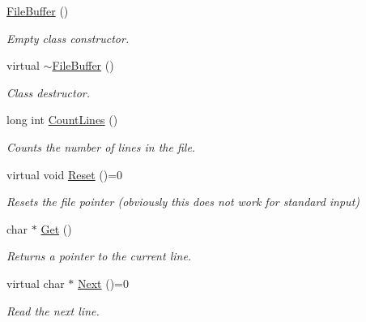 \begin{DoxyCompactItemize}
\item 
\hypertarget{classFileBuffer_ab243cfcb8a68ce791103594e974ee9ba}{
\hyperlink{classFileBuffer_ab243cfcb8a68ce791103594e974ee9ba}{FileBuffer} ()}
\label{classFileBuffer_ab243cfcb8a68ce791103594e974ee9ba}

\begin{DoxyCompactList}\small\item\em Empty class constructor. \end{DoxyCompactList}\item 
\hypertarget{classFileBuffer_ac92d5e7d145ea18fc6a3a6a18c788ebb}{
virtual \hyperlink{classFileBuffer_ac92d5e7d145ea18fc6a3a6a18c788ebb}{$\sim$FileBuffer} ()}
\label{classFileBuffer_ac92d5e7d145ea18fc6a3a6a18c788ebb}

\begin{DoxyCompactList}\small\item\em Class destructor. \end{DoxyCompactList}\item 
\hypertarget{classFileBuffer_a83e9378412806c2646639d2b4c7c457f}{
long int \hyperlink{classFileBuffer_a83e9378412806c2646639d2b4c7c457f}{CountLines} ()}
\label{classFileBuffer_a83e9378412806c2646639d2b4c7c457f}

\begin{DoxyCompactList}\small\item\em Counts the number of lines in the file. \end{DoxyCompactList}\item 
\hypertarget{classFileBuffer_ad460e02c3739484feb72e40bff60a09d}{
virtual void \hyperlink{classFileBuffer_ad460e02c3739484feb72e40bff60a09d}{Reset} ()=0}
\label{classFileBuffer_ad460e02c3739484feb72e40bff60a09d}

\begin{DoxyCompactList}\small\item\em Resets the file pointer (obviously this does not work for standard input) \end{DoxyCompactList}\item 
\hypertarget{classFileBuffer_a48bf46db592b676a68cc33dc10a0e272}{
char $\ast$ \hyperlink{classFileBuffer_a48bf46db592b676a68cc33dc10a0e272}{Get} ()}
\label{classFileBuffer_a48bf46db592b676a68cc33dc10a0e272}

\begin{DoxyCompactList}\small\item\em Returns a pointer to the current line. \end{DoxyCompactList}\item 
\hypertarget{classFileBuffer_a5b6e4589577674a2202be410aebd847d}{
virtual char $\ast$ \hyperlink{classFileBuffer_a5b6e4589577674a2202be410aebd847d}{Next} ()=0}
\label{classFileBuffer_a5b6e4589577674a2202be410aebd847d}

\begin{DoxyCompactList}\small\item\em Read the next line. \end{DoxyCompactList}\end{DoxyCompactItemize}
